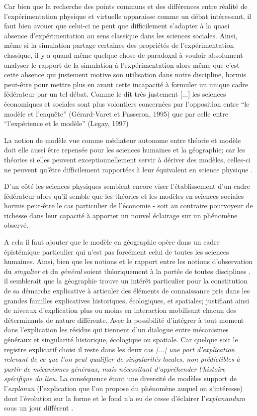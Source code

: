 Car bien que la recherche des points communs et des différences entre réalité de l'expérimentation physique et virtuelle apparaisse comme un débat intéressant, il faut bien avouer que celui-ci ne peut que difficilement s'adapter à la quasi absence d'expérimentation au sens classique dans les sciences sociales. Ainsi, même si la simulation partage certaines des propriétés de l'expérimentation classique, il y a quand même quelque chose de paradoxal à vouloir absolument analyser le rapport de la simulation à l'expérimentation alors même que c'est cette absence qui justement motive son utilisation dans notre discipline, hormis peut-être pour mettre plus en avant cette incapacité à formuler un unique cadre fédérateur par un tel débat. Comme le dit très justement \textcite{Phan2008} {[...] les sciences économiques et sociales sont plus volontiers concernées par l’opposition entre \enquote{le modèle et l’enquête}  (Gérard-Varet et Passeron, 1995) que par celle entre \enquote{l’expérience et le modèle} (Legay, 1997)}

La notion de modèle vue comme médiateur autonome entre théorie et modèle doit elle aussi être repensée pour les sciences humaines et la géographie; car les théories si elles peuvent exceptionnellement servir à dériver des modèles, celles-ci ne peuvent qu'être difficilement rapportées à leur équivalent en science physique \autocite{Pumain1997}.

D'un côté les sciences physiques semblent encore viser l'établissement d'un cadre fédérateur alors qu'il semble que les théories et les modèles en sciences sociales - hormis peut-être le cas particulier de l'économie - soit au contraire pourvoyeur de richesse dans leur capacité à apporter un nouvel éclairage sur un phénomène observé. 

A cela il faut ajouter que le modèle en géographie opère dans un cadre épistémique particulier qui n'est pas forcément celui de toutes les sciences humaines. Ainsi, bien que les notions et le rapport entre les notions d'observation du \textit{singulier} et du \textit{général} soient théoriquement à la portée de toutes disciplines \autocite{Dastes1992}, il semblerait que la géographie trouve un intérêt particulier pour la constitution de sa démarche explicative à articuler des éléments de connaissance pris dans les grandes familles explicatives historiques, écologiques, et spatiales; justifiant ainsi de niveaux d'explication plus ou moins en interaction mobilisant chacun des déterminants de nature différente. Avec la possibilité d'intégrer à tout moment dans l'explication les résidus qui tiennent d'un dialogue entre mécanismes généraux et singularité historique, écologique ou spatiale. Car quelque soit le registre explicatif choisi il reste dans les deux cas \textit{ [...] une part d'explication relevant de ce que l'on peut qualifier de singularités locales, non prédictibles à partir de mécanismes généraux, mais nécessitant d'appréhender l'histoire spécifique du lieu}. La conséquence étant une diversité de modèles support de l'\textit{explanan} (l’explication que l’on propose du phénomène auquel on s’intéresse) dont l'évolution sur la forme et le fond n'a eu de cesse d'éclairer l'\textit{explanandum} sous un jour différent \autocite{Dastes1992, Sanders2000, Sanders2013}.  

